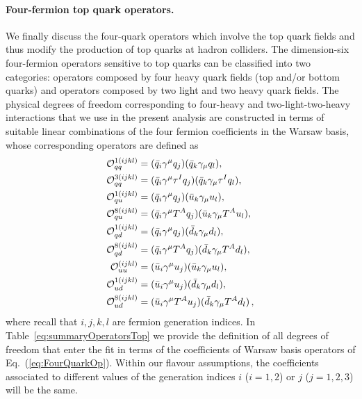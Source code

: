 \paragraph{Four-fermion top quark operators.}
%
We finally discuss the four-quark operators which involve the top quark 
fields and thus modify the production of top quarks at hadron colliders.
%
The dimension-six four-fermion operators sensitive to top quarks can be classified into
two categories: operators composed by four heavy quark fields (top and/or bottom quarks) and 
operators composed by two light and two heavy quark fields.
The physical degrees of freedom corresponding to four-heavy and
two-light-two-heavy interactions that we use in the present analysis are
constructed in terms of suitable linear combinations of the four fermion
coefficients in the Warsaw basis, whose corresponding operators are defined as
\begin{align}
	\qq{1}{qq}{ijkl}
	&= (\bar q_i \gamma^\mu q_j)(\bar q_k\gamma_\mu q_l)
	 \nonumber
	,\\
	\qq{3}{qq}{ijkl}
	&= (\bar q_i \gamma^\mu \tau^I q_j)(\bar q_k\gamma_\mu \tau^I q_l)
 \nonumber
	,\\
	\qq{1}{qu}{ijkl}
	&= (\bar q_i \gamma^\mu q_j)(\bar u_k\gamma_\mu u_l)
         \nonumber
	,\\
	\qq{8}{qu}{ijkl}
	&= (\bar q_i \gamma^\mu T^A q_j)(\bar u_k\gamma_\mu T^A u_l)
         \nonumber
	,\\
	\qq{1}{qd}{ijkl}
	&= (\bar q_i \gamma^\mu q_j)(\bar d_k\gamma_\mu d_l)
         \nonumber
	,\\
	\qq{8}{qd}{ijkl}
	&= (\bar q_i \gamma^\mu T^A q_j)(\bar d_k\gamma_\mu T^A d_l)
        \label{eq:FourQuarkOp} %
	,\\
	\qq{}{uu}{ijkl}
	&=(\bar u_i\gamma^\mu u_j)(\bar u_k\gamma_\mu u_l)
         \nonumber
	,\\
	\qq{1}{ud}{ijkl}
	&=(\bar u_i\gamma^\mu u_j)(\bar d_k\gamma_\mu d_l)
         \nonumber
	,\\
	\qq{8}{ud}{ijkl}
	&=(\bar u_i\gamma^\mu T^A u_j)(\bar d_k\gamma_\mu T^A d_l)
         \nonumber \, ,
\end{align}
where recall that $i,j,k,l$ are fermion generation indices.
%
In Table~\ref{eq:summaryOperatorsTop} we provide the definition of all degrees of freedom
that enter the fit
in terms of the coefficients of Warsaw basis operators of Eq.~(\ref{eq:FourQuarkOp}).
%
Within our flavour assumptions, the coefficients associated to different values of
the generation indices $i$ ($i=1,2$) or $j$ ($j=1,2,3$) will be the same.

